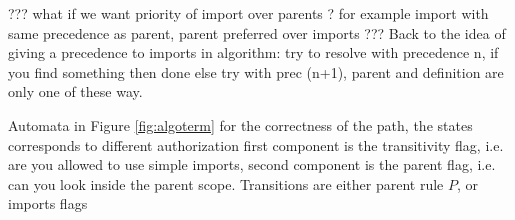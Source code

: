 
??? what if we want priority of import over parents ? for example import with same precedence as parent, parent preferred over imports ??? 
Back to the idea of giving a precedence to imports in algorithm: try to resolve with precedence n, if you find something then done else try with
prec (n+1), parent and definition are only one of these way.

Automata in Figure \ref{fig:algoterm} for the correctness of the path, the states corresponds to different authorization first component is the transitivity flag, i.e. are you allowed to 
use simple imports, second component is the parent flag, i.e. can you look inside the parent scope. Transitions are either parent rule $P$, or imports flags 

